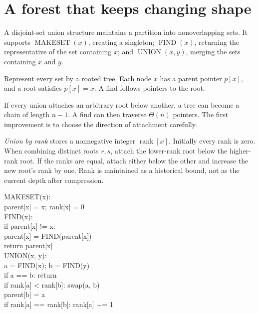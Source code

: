 \section{A forest that keeps changing shape}

A disjoint-set union structure maintains a partition into nonoverlapping sets. It supports \(\operatorname{MAKESET}(x)\), creating a singleton; \(\operatorname{FIND}(x)\), returning the representative of the set containing \(x\); and \(\operatorname{UNION}(x,y)\), merging the sets containing \(x\) and \(y\).

Represent every set by a rooted tree. Each node \(x\) has a parent pointer \(p[x]\), and a root satisfies \(p[x]=x\). A find follows pointers to the root.

If every union attaches an arbitrary root below another, a tree can become a chain of length \(n-1\). A find can then traverse \(\Theta(n)\) pointers. The first improvement is to choose the direction of attachment carefully.

\emph{Union by rank} stores a nonnegative integer \(\operatorname{rank}[x]\). Initially every rank is zero. When combining distinct roots \(r,s\), attach the lower-rank root below the higher-rank root. If the ranks are equal, attach either below the other and increase the new root's rank by one. Rank is maintained as a historical bound, not as the current depth after compression.

\begin{center}
\begin{minipage}{.87\textwidth}
\ttfamily\small
MAKESET(x):\\
\hspace*{1.5em}parent[x] = x; rank[x] = 0\\[4pt]
FIND(x):\\
\hspace*{1.5em}if parent[x] != x:\\
\hspace*{3em}parent[x] = FIND(parent[x])\\
\hspace*{1.5em}return parent[x]\\[4pt]
UNION(x, y):\\
\hspace*{1.5em}a = FIND(x); b = FIND(y)\\
\hspace*{1.5em}if a == b: return\\
\hspace*{1.5em}if rank[a] < rank[b]: swap(a, b)\\
\hspace*{1.5em}parent[b] = a\\
\hspace*{1.5em}if rank[a] == rank[b]: rank[a] += 1
\end{minipage}
\end{center}

